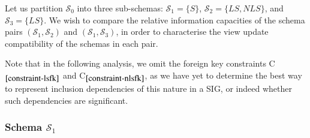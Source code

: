 \documentclass{sig-alternate-05-2015}
\newcounter{constraint}
\newcommand{\LS}{\ensuremath{\mathit{LS}}}
\newcommand{\NLS}{\ensuremath{\mathit{NLS}}}
\newcommand{\SC}[1]{\ensuremath{\mathcal{S}_{#1}}}
\begin{document}
Let us partition \(\SC{0}\) into three sub-schemas: \(\SC{1} = \{S\}\), \(\SC{2} = \{\LS, \NLS\}\), and \(\SC{3} = \{LS\}\). We wish to compare the relative information capacities of the schema pairs \((\SC{1}, \SC{2})\) and \((\SC{1}, \SC{3})\), in order to characterise the view update compatibility of the schemas in each pair.

Note that in the following analysis, we omit the foreign key constraints C\(_{\ref{constraint-lsfk}}\) and C\(_{\ref{constraint-nlsfk}}\), as we have yet to determine the best way to represent inclusion dependencies of this nature in a SIG, or indeed whether such dependencies are significant.




\subsubsection{Schema \(\SC{1}\)}
\label{sec-constraints-s-i}
\end{document}
